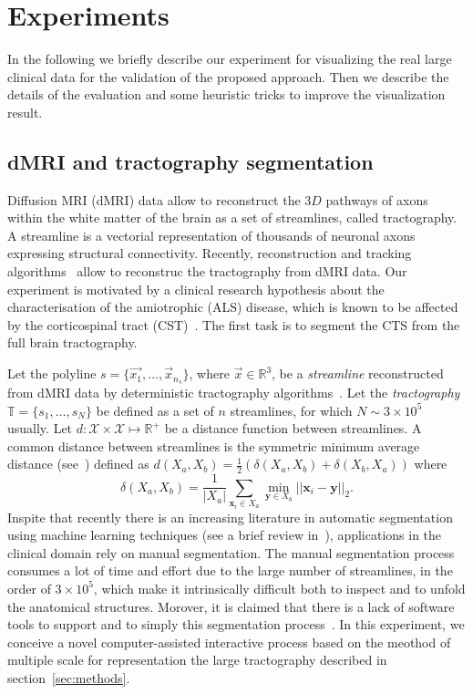 \section{Experiments}
\label{sec:experiments}
In the following we briefly describe our experiment for visualizing the real large clinical data for the validation of the proposed approach. Then we describe the details of the evaluation and some heuristic tricks to improve the visualization result.
\subsection{dMRI and tractography segmentation}
Diffusion MRI (dMRI) data allow to reconstruct the $3D$ pathways of axons within the white matter of the brain as a set of
streamlines, called tractography. A streamline is a vectorial representation of thousands of neuronal axons expressing structural
connectivity. Recently, reconstruction and tracking algorithms~\cite{mori2002fiber,zhang2008identifying} allow to reconstruc the tractography from dMRI data. Our experiment is motivated by a clinical research hypothesis about the characterisation of the amiotrophic (ALS) disease, which is known to be affected by the corticospinal tract (CST)~\cite{cosottini2010evaluation,sage2009quantitative}. The first task is to segment the CTS from the full brain tractography. 

Let the polyline $s =\{ \vec{x_1},\ldots,\vec{x}_{n_s}\}$, where $\vec{x} \in \mathbb{R}^3$, be a \emph{streamline} reconstructed from dMRI data by deterministic tractography algorithms~\cite{mori2002fiber}. Let the \emph{tractography} $ \mathbb{T}  = \{s_1,\ldots,s_N\}$ be defined as a set of $n$ streamlines, for which $N \sim 3 \times 10^5$ usually. Let $d:\mathcal{X} \times
\mathcal{X} \mapsto \mathbb{R}^+$ be a distance function between
streamlines. A common distance between streamlines is the symmetric
minimum average distance (see~\cite{zhang2008identifying}) defined as
$d(X_a,X_b) = \frac{1}{2}(\delta(X_a,X_b) + \delta(X_b,X_a))$ where
\begin{equation}
  \label{equ:mam_distance}
  \delta(X_a,X_b) = \frac{1}{|X_a|} \sum_{\mathbf{x}_i \in X_a}
    \min_{\mathbf{y} \in X_b} ||\mathbf{x}_i - \mathbf{y}||_2.
\end{equation}
Inspite that recently there is an increasing literature in automatic
segmentation using machine learning techniques (see a brief review in~\cite{wang2011tractography,olivetti2011supervised}), applications in the
clinical domain rely on manual segmentation. The manual segmentation process consumes a lot of time and effort due to the large number of streamlines, in the order of $3 \times 10^5$, which make it intrinsically difficult both to inspect and to unfold the anatomical structures. Morover, 
it is claimed that there is a lack of software tools to support and to simply this segmentation process~\cite{olivetti2013fast}. In this experiment, we conceive a novel computer-assisted interactive process based on the meothod of multiple scale for representation the large tractography described in section~\ref{sec:methods}.
